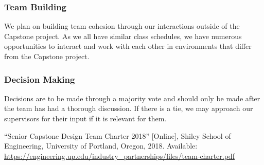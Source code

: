 \documentclass{article}
\begin{document}
\subsubsection*{Team Building}

We plan on building team cohesion through our interactions outside of the
Capstone project. As we all have similar class schedules, we have numerous
opportunities to interact and work with each other in environments that differ
from the Capstone project. 

\subsubsection*{Decision Making} 

Decisions are to be made through a majority vote and should only be made after
the team has had a thorough discussion. If there is a tie, we may approach our
supervisors for their input if it is relevant for them.

\newpage{}

\begin{thebibliography}{1}
   ``Senior Capstone Design Team Charter 2018'' [Online], Shiley
  School of Engineering, University of Portland, Oregon, 2018. Available:
  \url{https://engineering.up.edu/industry_partnerships/files/team-charter.pdf}
\end{thebibliography}
\end{document}

